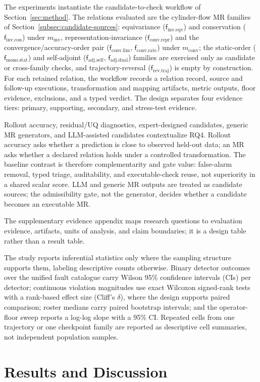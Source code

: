 \documentclass[preprint,12pt,authoryear]{elsarticle}
\providecommand{\minv}{m_{\mathrm{inv}}}
\providecommand{\mconv}{m_{\mathrm{conv}}}
\providecommand{\fIeqv}{\mathsf{f}_{\mathrm{inv}.\mathrm{eqv}}}
\providecommand{\fIcon}{\mathsf{f}_{\mathrm{inv}.\mathrm{con}}}
\providecommand{\fAself}{\mathsf{f}_{\mathrm{adj}.\mathrm{self}}}
\providecommand{\fAdual}{\mathsf{f}_{\mathrm{adj}.\mathrm{dual}}}
\providecommand{\fRtraj}{\mathsf{f}_{\mathrm{rev}.\mathrm{traj}}}
\providecommand{\fMstat}{\mathsf{f}_{\mathrm{mono}.\mathrm{stat}}}
\providecommand{\fClim}{\mathsf{f}_{\mathrm{conv}.\mathrm{lim}}}
\providecommand{\fCrate}{\mathsf{f}_{\mathrm{conv}.\mathrm{rate}}}
\providecommand{\fCrepr}{\mathsf{f}_{\mathrm{conv}.\mathrm{repr}}}
\begin{document}
The experiments instantiate the candidate-to-check workflow of Section~\ref{sec:method}. The relations evaluated are the cylinder-flow MR families of Section~\ref{subsec:candidate-sources}: equivariance ($\fIeqv$) and conservation ($\fIcon$) under $\minv$, representation-invariance ($\fCrepr$) and the convergence/accuracy-order pair ($\fClim$, $\fCrate$) under $\mconv$; the static-order ($\fMstat$) and self-adjoint ($\fAself$, $\fAdual$) families are exercised only as candidate or cross-family checks, and trajectory-reversal ($\fRtraj$) is empty by construction. For each retained relation, the workflow records a relation record, source and follow-up executions, transformation and mapping artifacts, metric outputs, floor evidence, exclusions, and a typed verdict. The design separates four evidence tiers: primary, supporting, secondary, and stress-test evidence.

Rollout accuracy, residual/UQ diagnostics, expert-designed candidates, generic MR generators, and LLM-assisted candidates contextualize RQ4. Rollout accuracy asks whether a prediction is close to observed held-out data; an MR asks whether a declared relation holds under a controlled transformation. The baseline contrast is therefore complementarity and gate value: false-alarm removal, typed triage, auditability, and executable-check reuse, not superiority in a shared scalar score. LLM and generic MR outputs are treated as candidate sources; the admissibility gate, not the generator, decides whether a candidate becomes an executable MR.

The supplementary evidence appendix maps research questions to evaluation evidence, artifacts, units of analysis, and claim boundaries; it is a design table rather than a result table.

The study reports inferential statistics only where the sampling structure supports them, labeling descriptive counts otherwise. Binary detector outcomes over the unified fault catalogue carry Wilson 95\% confidence intervals (CIs) per detector; continuous violation magnitudes use exact Wilcoxon signed-rank tests with a rank-based effect size (Cliff's $\delta$), where the design supports paired comparison; roster medians carry paired bootstrap intervals; and the operator-floor sweep reports a log-log slope with a 95\% CI. Repeated cells from one trajectory or one checkpoint family are reported as descriptive cell summaries, not independent population samples.

\section{Results and Discussion}
\label{sec:results}
\end{document}
